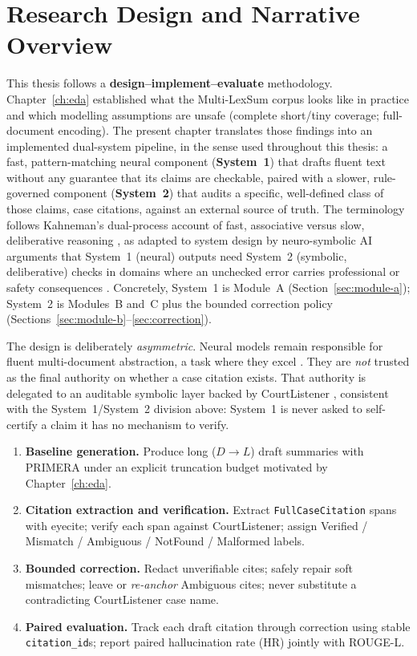 \label{ch:methodology}
\section{Research Design and Narrative Overview}
\label{sec:method-design}

This thesis follows a \textbf{design--implement--evaluate} methodology. Chapter~\ref{ch:eda} established what the Multi-LexSum corpus looks like in practice and which modelling assumptions are unsafe (complete short/tiny coverage; full-document encoding). The present chapter translates those findings into an implemented dual-system pipeline, in the sense used throughout this thesis: a fast, pattern-matching neural component (\textbf{System~1}) that drafts fluent text without any guarantee that its claims are checkable, paired with a slower, rule-governed component (\textbf{System~2}) that audits a specific, well-defined class of those claims, case citations, against an external source of truth. The terminology follows Kahneman's dual-process account of fast, associative versus slow, deliberative reasoning \cite{kahneman2011thinkingbook}, as adapted to system design by neuro-symbolic AI arguments that System~1 (neural) outputs need System~2 (symbolic, deliberative) checks in domains where an unchecked error carries professional or safety consequences \cite{kautz2022thirdaisummer}. Concretely, System~1 is Module~A (Section~\ref{sec:module-a}); System~2 is Modules~B and~C plus the bounded correction policy (Sections~\ref{sec:module-b}--\ref{sec:correction}).

The design is deliberately \emph{asymmetric}. Neural models remain responsible for fluent multi-document abstraction, a task where they excel \cite{xiao2022primera,shen2022multilexsum}. They are \emph{not} trusted as the final authority on whether a case citation exists. That authority is delegated to an auditable symbolic layer backed by CourtListener \cite{courtlistener_api,eyecite2021}, consistent with the System~1/System~2 division above: System~1 is never asked to self-certify a claim it has no mechanism to verify.

\begin{enumerate}
  \item \textbf{Baseline generation.} Produce long ($D\rightarrow L$) draft summaries with PRIMERA under an explicit truncation budget motivated by Chapter~\ref{ch:eda}.
  \item \textbf{Citation extraction and verification.} Extract \texttt{FullCaseCitation} spans with eyecite; verify each span against CourtListener; assign Verified / Mismatch / Ambiguous / NotFound / Malformed labels.
  \item \textbf{Bounded correction.} Redact unverifiable cites; safely repair soft mismatches; leave or \emph{re-anchor} Ambiguous cites; never substitute a contradicting CourtListener case name.
  \item \textbf{Paired evaluation.} Track each draft citation through correction using stable \texttt{citation\_id}s; report paired hallucination rate (HR) jointly with ROUGE-L.
\end{enumerate}

